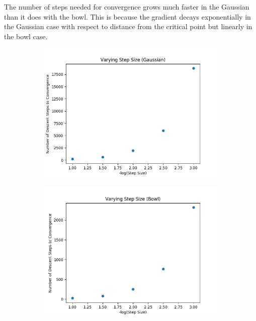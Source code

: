 \documentclass[8pt]{article}
\begin{document}
%
The number of steps needed for convergence grows much faster in the Gaussian than it does with the bowl. This is because the gradient decays exponentially in the Gaussian case with respect to distance from the critical point but linearly in the bowl case.
%
\begin{figure}[H]
\centering
        \begin{subfigure}[b]{0.38\textwidth}
                \includegraphics[width=\linewidth]{../P1/figs/step_gauss.png}
        \end{subfigure}%
        \begin{subfigure}[b]{0.38\textwidth}
                \includegraphics[width=\linewidth]{../P1/figs/step_bowl.png}
        \end{subfigure}%
\end{figure}
\end{document}
